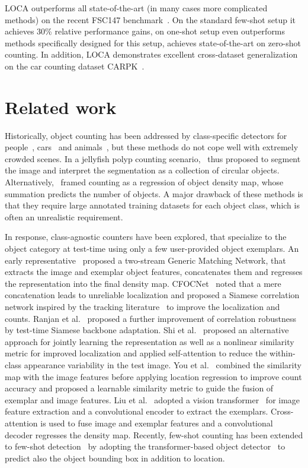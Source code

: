 \documentclass[10pt,twocolumn,letterpaper]{article}
\begin{document}
LOCA outperforms all state-of-the-art (in many cases more complicated methods) on the recent FSC147 benchmark~\cite{famnet}. 
On the standard few-shot setup it achieves 30\% relative performance gains, on one-shot setup even outperforms methods specifically designed for this setup, achieves state-of-the-art on zero-shot counting.
In addition, LOCA demonstrates excellent cross-dataset generalization on the car counting dataset CARPK~\cite{carpk}.


\section{Related work}

Historically, object counting has been addressed by class-specific detectors for people~\cite{crowdcounting, crowdcounting2}, cars~\cite{cars, carpk} and animals~\cite{animals}, but these methods do not cope well with extremely crowded scenes. In a jellyfish polyp counting scenario,~\cite{polyps} thus proposed to segment the image and interpret the segmentation as a collection of circular objects.
Alternatively,~\cite{crowdcounting, regression1} framed counting as a regression of object density map, whose summation predicts the number of objects. 
A major drawback of these methods is that they require large annotated training datasets for each object class, which is often an unrealistic requirement.

In response, class-agnostic counters have been explored, that specialize to the object category at test-time using only a few user-provided object exemplars.
An early representative~\cite{gmn} proposed a two-stream Generic Matching Network, that extracts the image and exemplar object features, concatenates them and regresses the representation into the final density map. 
CFOCNet~\cite{cfocnet} noted that a mere concatenation leads to unreliable localization and proposed a Siamese correlation network inspired by the tracking literature~\cite{siamfc} to improve the localization and counts.
Ranjan et al.~\cite{famnet} proposed a further improvement of correlation robustness by test-time Siamese backbone adaptation.
Shi et al.~\cite{bmnet} proposed an alternative approach for jointly learning the representation as well as a nonlinear similarity metric for improved localization and applied self-attention to reduce the within-class appearance variability in the test image.
You et al.~\cite{safecount} combined the similarity map with the image features before applying location regression to improve count accuracy and proposed a learnable similarity metric to guide the fusion of exemplar and image features.
Liu et al.~\cite{countr} adopted a vision transformer~\cite{vit} for image feature extraction and a convolutional encoder to extract the exemplars. Cross-attention is  used to fuse image and exemplar features and a convolutional decoder regresses the density map.
Recently, few-shot counting has been extended to few-shot detection~\cite{countingdetr} by adopting the transformer-based object detector~\cite{anchor_detr} to predict also the object bounding box in addition to location.
\end{document}
